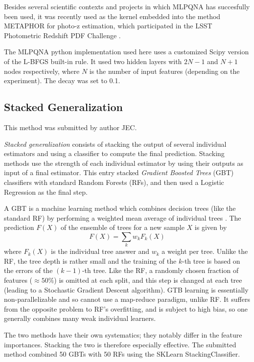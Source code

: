 \documentclass[twocolumn,twocolappendix]{aastex63}
\begin{document}
Besides several scientific contexts and projects in which MLPQNA has succesfully
been used, it was recently used as the kernel embedded into the method {\sc
METAPHOR} \citep{cavuoti20} for photo-z estimation, which participated in the
LSST Photometric Redshift PDF Challenge \citep{schmidt20}. 

The {\sc MLPQNA} python implementation used here
uses a customized Scipy version of the L-BFGS built-in rule.
It used two hidden layers with $2N-1$ and $N+1$ nodes respectively,
where $N$ is the number of input features (depending on the experiment).
The decay was set to 0.1.


\subsection{ {\sc Stacked Generalization} }
This method was submitted by author JEC.

\emph{Stacked generalization} consists of stacking the output of several individual estimators and 
using a classifier to compute the final prediction. Stacking methods use the strength of each 
individual estimator by using their outputs as input of a final estimator.  This entry stacked
\emph{Gradient Boosted Trees} (GBT) classifiers with standard Random Forests (RFs), and then used a Logistic 
Regression as the final step.

A GBT is a machine learning method which combines decision trees (like the standard RF)
by performing a weighted mean average of individual trees \citep{Friedman:2002we,RefWorks:1634}. 
The prediction $F(X)$ of the ensemble of trees for a new sample $X$ is given by
\begin{equation}
F(X) = \sum_k w_k F_k(X)
\end{equation}
where $F_k(X)$ is the individual tree answer and $w_k$ a weight per tree. Unlike the RF, the 
tree depth is rather small and the training  of the $k$-th tree is based on the errors of the
$(k-1)$-th tree.  Like the RF, a randomly chosen fraction of features ($\approx 50\%$) is 
omitted at each split, and this step is changed at each tree (leading to a Stochastic Gradient Descent 
algorithm).  GTB learning is essentially non-parallelizable and so cannot use a map-reduce paradigm, 
unlike RF. It suffers from the opposite problem to RF's overfitting, and is subject
to high bias, so one generally combines many weak individual learners.

The two methods have their own systematics; they notably differ in the feature importances. Stacking 
the two is therefore especially effective.  The submitted method combined 50 GBTs with
50 RFs using the {\sc SKLearn} {\sc StackingClassifier}.
\end{document}

